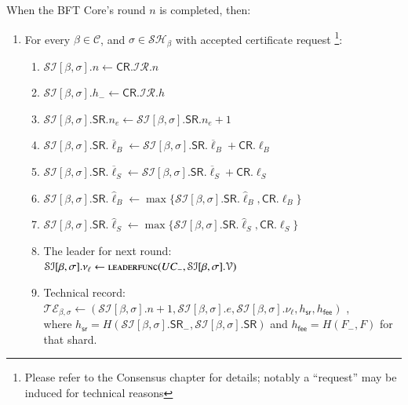 When the BFT Core's round $n$ is completed, then:
\begin{enumerate}
	\item For every $\beta\in\mathcal{C}$, and $\sigma\in \mathcal{SH}_\beta$ with accepted certificate request \footnote{Please refer to the Consensus chapter for details; notably a ``request'' may be induced for technical reasons}:
	\begin{enumerate}
		\item $\mathcal{SI}[\beta, \sigma].n \gets \mathsf{CR}.\mathcal{IR}.n$
		\item $\mathcal{SI}[\beta, \sigma].h_- \gets \mathsf{CR}.\mathcal{IR}.h$
		\item $\mathcal{SI}[\beta, \sigma].\mathsf{SR}.n_e \gets \mathcal{SI}[\beta, \sigma].\mathsf{SR}.n_e + 1$
		\item $\mathcal{SI}[\beta, \sigma].\mathsf{SR}.\overline{\ell}_B \gets \mathcal{SI}[\beta, \sigma].\mathsf{SR}.\overline{\ell}_B + \mathsf{CR}.\ell_B$
		\item $\mathcal{SI}[\beta, \sigma].\mathsf{SR}.\overline{\ell}_S \gets \mathcal{SI}[\beta, \sigma].\mathsf{SR}.\overline{\ell}_S + \mathsf{CR}.\ell_S$
		\item $\mathcal{SI}[\beta, \sigma].\mathsf{SR}.\hat{\ell}_B \gets \max\{\mathcal{SI}[\beta, \sigma].\mathsf{SR}.\hat{\ell}_B, \mathsf{CR}.\ell_B\}$
		\item $\mathcal{SI}[\beta, \sigma].\mathsf{SR}.\hat{\ell}_S \gets \max\{\mathcal{SI}[\beta, \sigma].\mathsf{SR}.\hat{\ell}_S, \mathsf{CR}.\ell_S\}$
		\item The leader for next round: \\
			$\mathcal{SI}[\beta, \sigma].\nu_\ell \gets \Call{leaderfunc}{UC_-, \mathcal{SI}[\beta, \sigma].\mathcal{V}}$
		\item Technical record: \\
			$\mathcal{TE}_{\beta,\sigma} \gets (\mathcal{SI}[\beta,\sigma].n+1, \mathcal{SI}[\beta,\sigma].e, \mathcal{SI}[\beta,\sigma].\nu_\ell, h_\mathsf{sr}, h_\mathsf{fee})$ \;, \\
			where $h_\mathsf{sr}=H(\mathcal{SI}[\beta,\sigma].\mathsf{SR}_-, \mathcal{SI}[\beta,\sigma].\mathsf{SR})$ and $h_\mathsf{fee}=H(F_-,F)$ for that shard.
	\end{enumerate}


\end{enumerate}
